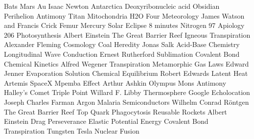 \answerkey
{} Bats
 Mars
 Au
 Isaac Newton
 Antarctica
 Deoxyribonucleic acid
 Obsidian
 Perihelion
 Antimony
 Titan
 Mitochondria
 H2O
 Four
 Meteorology
 James Watson and Francis Crick
 Femur
 Mercury
 Solar Eclipse
 8 minutes
 Nitrogen
 97%
 Apiology
 206
 Photosynthesis
 Albert Einstein
 The Great Barrier Reef
 Igneous
 Transpiration
 Alexander Fleming
 Cosmology
 Coal
 Heredity
 Jonas Salk
 Acid-Base Chemistry
 Longitudinal Wave
 Conduction
 Ernest Rutherford
 Sublimation
 Covalent Bond
 Chemical Kinetics
 Alfred Wegener
 Transpiration
 Metamorphic
 Gas Laws
 Edward Jenner
 Evaporation
 Solution
 Chemical Equilibrium
 Robert Edwards
 Latent Heat
 Artemis
 SpaceX
 Mpemba Effect
 Arthur Ashkin
 Olympus Mons
 Antimony
 Halley's Comet
 Triple Point
 Willard F. Libby
 Thermosphere
 Google
 Echolocation
 Joseph Charles Farman
 Argon
 Malaria
 Semiconductors
 Wilhelm Conrad Röntgen
 The Great Barrier Reef
 Top Quark
 Phagocytosis
 Reusable Rockets
 Albert Einstein
 Drag
 Perseverance
 Elastic Potential Energy
 Covalent Bond
 Transpiration
 Tungsten
 Tesla
 Nuclear Fusion
\endanswerkey